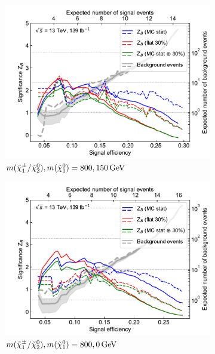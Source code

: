 \begin{figure}[hb]
	\centering
	\begin{subfigure}[b]{0.5\linewidth}
		\centering\includegraphics[width=1.0\textwidth]{N-1_cut_scan/z_vs_effs_800_150.pdf}
		\caption{$m(\charg/\neutr), m(\lsp) =  800, \SI{150}{\GeV}$}
	\end{subfigure}\hfill
	\begin{subfigure}[b]{0.5\linewidth}
		\centering\includegraphics[width=1.0\textwidth]{N-1_cut_scan/z_vs_effs_800_0.pdf}
		\caption{$m(\charg/\neutr), m(\lsp) =  800, \SI{0}{\GeV}$}
	\end{subfigure}\hfill
	\par\bigskip
	\begin{subfigure}[b]{0.5\linewidth}

\end{subfigure}
\end{figure}
